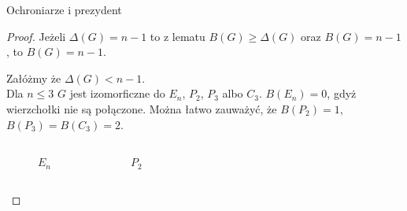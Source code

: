 \documentclass[polish]{beamer}
\begin{document}
\begin{frame}{Ochroniarze i prezydent}
    \begin{proof}
        \renewcommand{\qedsymbol}{}
        Jeżeli $\Delta\left(G\right)=n-1$ to z lematu $B\left(G\right)\ge \Delta\left(G\right)$ oraz $B\left(G\right) = n-1$, 
        to $B\left(G\right)=n-1$.
        \pause

        Załóżmy że $\Delta\left(G\right) < n-1$.\\
        \pause
        Dla $n\le3$ $G$ jest izomorficzne do $E_n$, $P_2$, $P_3$ albo $C_3$. $B\left(E_n\right) = 0$, gdyż wierzchołki nie są połączone.
        Można łatwo zauważyć, że $B\left(P_2\right) = 1$, $B\left(P_3\right) = B\left(C_3\right) = 2$. 
        \pause
        \begin{examples}
            \begin{columns}[t]
                    \centering
                    \begin{figure}    
                        \caption{$E_n$}
                    \end{figure}    
                    \centering
                    \begin{figure}    
                        \caption{$P_2$}
                    \end{figure}    
                    \centering
                    \begin{figure}    
\end{figure}
\end{columns}
\end{examples}
\end{proof}
\end{frame}
\end{document}
